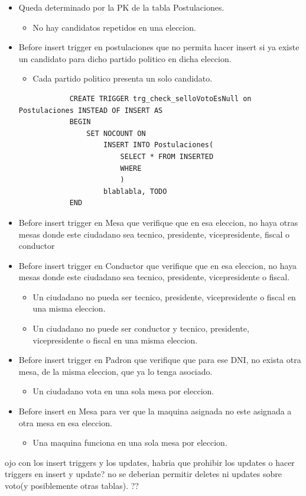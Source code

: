 \begin{itemize}
	\item Queda determinado por la PK de la tabla Postulaciones.
		\begin{itemize}
			\item No hay candidatos repetidos en una eleccion.
		\end{itemize}

	\item Before insert trigger en postulaciones que no permita hacer insert si ya existe un candidato para dicho partido politico en dicha eleccion.
		\begin{itemize}
			\item Cada partido politico presenta un solo candidato.
		\end{itemize}
		\begin{lstlisting}
			CREATE TRIGGER trg_check_selloVotoEsNull on Postulaciones INSTEAD OF INSERT AS 
			BEGIN
				SET NOCOUNT ON
					INSERT INTO Postulaciones(
						SELECT * FROM INSERTED
						WHERE 
						)
					blablabla, TODO
			END
		\end{lstlisting}
	
	\item Before insert trigger en Mesa que verifique que en esa eleccion, no haya otras mesas donde este ciudadano sea tecnico, presidente, vicepresidente, fiscal o conductor
	\item Before insert trigger en Conductor que verifique que en esa eleccion, no haya  mesas donde este ciudadano sea tecnico, presidente, vicepresidente o fiscal.
		\begin{itemize}
			\item Un ciudadano no pueda ser tecnico, presidente, vicepresidente o fiscal en una misma eleccion.
			\item Un ciudadano no puede ser conductor y tecnico, presidente, vicepresidente o fiscal en una misma eleccion.
		\end{itemize}	

	\item Before insert trigger en Padron que verifique que para ese DNI, no exista otra mesa, de la misma eleccion, que ya lo tenga asociado.
		\begin{itemize}
			\item Un ciudadano vota en una sola mesa por eleccion.
		\end{itemize}

	\item Before insert en Mesa para ver que la maquina asignada no este asignada a otra mesa en esa eleccion.
		\begin{itemize}
			\item Una maquina funciona en una sola mesa por eleccion.
		\end{itemize}

\end{itemize}





ojo con los insert triggers y los updates, habria que prohibir los updates o hacer triggers en insert y update?
no se deberian permitir deletes ni updates sobre voto(y posiblemente otras tablas). ??